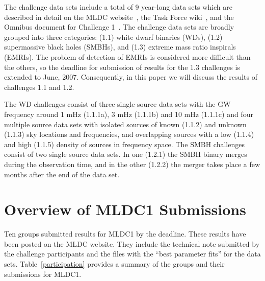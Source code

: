 \documentclass[12pt]{iopart}
\begin{document}
The challenge data sets include a total of 9 year-long data sets which are described in detail on the MLDC website~\cite{MLDCweb}, the Task Force wiki~\cite{MLDCwiki}, and the Omnibus document for Challenge 1~\cite{MLDCdoc}. The challenge data sets are broadly grouped into three categories: (1.1) white dwarf binaries (WDs), (1.2) supermassive black holes (SMBHs), and (1.3) extreme mass ratio inspirals (EMRIs). The problem of detection of EMRIs is considered more difficult than the others, so the deadline for submission of results for the 1.3 challenges is extended to June, 2007. Consequently, in this paper we will discuss the results of challenges 1.1 and 1.2.

The WD challenges consist of three single source data sets with the GW frequency around 1 mHz (1.1.1a), 3 mHz (1.1.1b) and 10 mHz (1.1.1c) and four multiple source data sets with isolated sources of known (1.1.2) and unknown (1.1.3) sky locations and frequencies, and overlapping sources with a low (1.1.4) and high (1.1.5) density of sources in frequency space. The SMBH challenges consist of two single source data sets. In one (1.2.1) the SMBH binary merges during the observation time, and in the other (1.2.2) the merger takes place a few months after the end of the data set.

\section{Overview of MLDC1 Submissions}

Ten groups submitted results for MLDC1 by the deadline. These results have been posted on the MLDC website. They include the technical note submitted by the challenge participants and the files with the ``best parameter fits'' for the data sets. Table~\ref{participation} provides a summary of the groups and their submissions for MLDC1.
\end{document}
